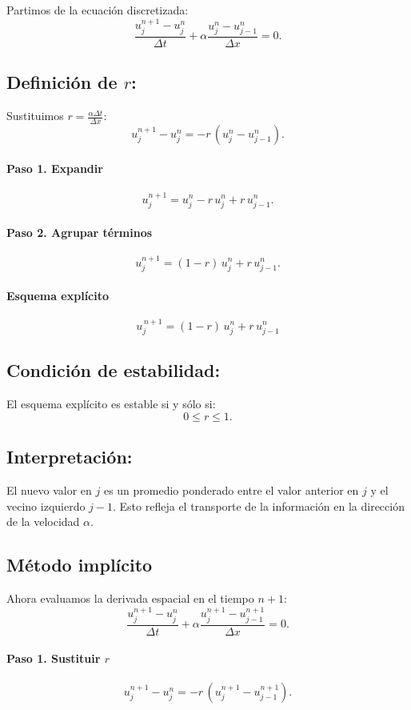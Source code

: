 \documentclass[12pt,a4paper]{article}
\begin{document}
Partimos de la ecuación discretizada:
\[
\frac{u_j^{n+1}-u_j^n}{\Delta t} + \alpha \frac{u_j^n - u_{j-1}^n}{\Delta x} = 0.
\]

\subsection*{Definición de $r$:}
Sustituimos $r = \tfrac{\alpha \Delta t}{\Delta x}$:
\[
u_j^{n+1}-u_j^n = -r\,(u_j^n - u_{j-1}^n).
\]

\paragraph{Paso 1. Expandir}  
\[
u_j^{n+1} = u_j^n - r\,u_j^n + r\,u_{j-1}^n.
\]

\paragraph{Paso 2. Agrupar términos}  
\[
u_j^{n+1} = (1-r)\,u_j^n + r\,u_{j-1}^n.
\]

\paragraph{Esquema explícito}  
\[
\boxed{u_j^{\,n+1} = (1-r)\,u_j^n + r\,u_{j-1}^n}
\]

\subsection*{Condición de estabilidad:}
El esquema explícito es estable si y sólo si:
\[
0 \leq r \leq 1.
\]

\subsection*{Interpretación:}
El nuevo valor en $j$ es un promedio ponderado entre el valor anterior en $j$ y el vecino izquierdo $j-1$.  
Esto refleja el transporte de la información en la dirección de la velocidad $\alpha$.

\subsection{Método implícito}

Ahora evaluamos la derivada espacial en el tiempo $n+1$:
\[
\frac{u_j^{n+1}-u_j^n}{\Delta t} + \alpha \frac{u_j^{n+1} - u_{j-1}^{n+1}}{\Delta x} = 0.
\]

\paragraph{Paso 1. Sustituir $r$}  
\[
u_j^{n+1} - u_j^n = -r\,(u_j^{n+1} - u_{j-1}^{n+1}).
\]
\end{document}
